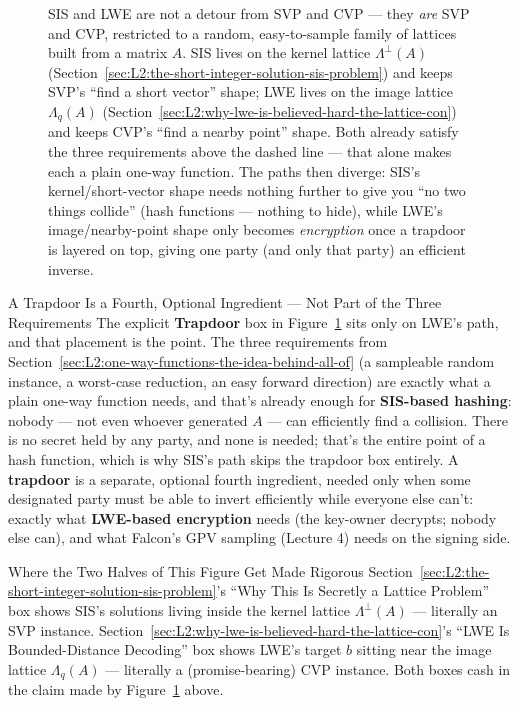 \begin{figure}[ht]
\caption{SIS and LWE are not a detour from SVP and CVP --- they \emph{are} SVP and CVP, restricted to a random, easy-to-sample family of lattices built from a matrix $A$. SIS lives on the kernel lattice $\Lambda^\perp(A)$ (Section~\ref{sec:L2:the-short-integer-solution-sis-problem}) and keeps SVP's ``find a short vector'' shape; LWE lives on the image lattice $\Lambda_q(A)$ (Section~\ref{sec:L2:why-lwe-is-believed-hard-the-lattice-con}) and keeps CVP's ``find a nearby point'' shape. Both already satisfy the three requirements above the dashed line --- that alone makes each a plain one-way function. The paths then diverge: SIS's kernel/short-vector shape needs nothing further to give you ``no two things collide'' (hash functions --- nothing to hide), while LWE's image/nearby-point shape only becomes \emph{encryption} once a trapdoor is layered on top, giving one party (and only that party) an efficient inverse.}
\label{fig:svp-cvp-to-sis-lwe}
\end{figure}

\begin{rmkbox}{A Trapdoor Is a Fourth, Optional Ingredient --- Not Part of the Three Requirements}
The explicit \textbf{Trapdoor} box in Figure~\ref{fig:svp-cvp-to-sis-lwe} sits only on LWE's path, and that placement is the point. The three requirements from Section~\ref{sec:L2:one-way-functions-the-idea-behind-all-of} (a sampleable random instance, a worst-case reduction, an easy forward direction) are exactly what a plain one-way function needs, and that's already enough for \textbf{SIS-based hashing}: nobody --- not even whoever generated $A$ --- can efficiently find a collision. There is no secret held by any party, and none is needed; that's the entire point of a hash function, which is why SIS's path skips the trapdoor box entirely. A \textbf{trapdoor} is a separate, optional fourth ingredient, needed only when some designated party must be able to invert efficiently while everyone else can't: exactly what \textbf{LWE-based encryption} needs (the key-owner decrypts; nobody else can), and what Falcon's GPV sampling (Lecture 4) needs on the signing side.
\end{rmkbox}

\begin{rmkbox}{Where the Two Halves of This Figure Get Made Rigorous}
Section~\ref{sec:L2:the-short-integer-solution-sis-problem}'s ``Why This Is Secretly a Lattice Problem'' box shows SIS's solutions living inside the kernel lattice $\Lambda^\perp(A)$ --- literally an SVP instance. Section~\ref{sec:L2:why-lwe-is-believed-hard-the-lattice-con}'s ``LWE Is Bounded-Distance Decoding'' box shows LWE's target $b$ sitting near the image lattice $\Lambda_q(A)$ --- literally a (promise-bearing) CVP instance. Both boxes cash in the claim made by Figure~\ref{fig:svp-cvp-to-sis-lwe} above.
\end{rmkbox}

